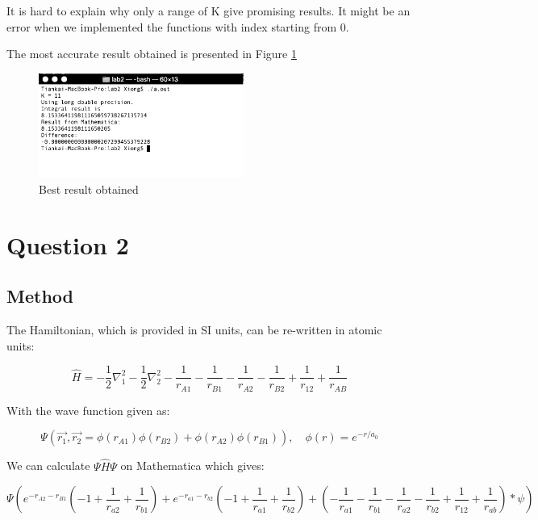 \documentclass{article}
\begin{document}
It is hard to explain why only a range of K give promising
results. It might be an error when we implemented the functions with
index starting from 0.

The most accurate result obtained is presented in Figure \ref{fig:Q2}

\begin{figure}[H]
  \centering
  \includegraphics[width=0.6\textwidth]{Q2_best_result.png}
  \caption{Best result obtained}
  \label{fig:Q2}
\end{figure}

\section{Question 2}
\label{sec-3}
\subsection{Method}
\label{sec-3-1}

The Hamiltonian, which is provided in SI units, can be re-written
in atomic units:

\begin{equation}
  \hat{H} = -\frac{1}{2}\nabla^2_1 - \frac{1}{2}\nabla^2_2 - \frac{1}{r_{A1}}
  - \frac{1}{r_{B1}}  - \frac{1}{r_{A2}}  - \frac{1}{r_{B2}}  + \frac{1}{r_{12}}
   + \frac{1}{r_{AB}}
\end{equation}

With the wave function given as:

\begin{equation}
  \Psi(\vec{r_1}, \vec{r_2} = \phi(r_{A1}) \phi(r_{B2}) + \phi(r_{A2}) \phi(r_{B1})), \quad \phi(r) = e^{-r/a_0}
\end{equation}

We can calculate $\Psi \hat{H} \Psi$ on Mathematica which gives:

\begin{equation}
  \Psi (e^{-r_{A2} - r_{B1}}(-1 + \frac{1}{r_{a2}} + \frac{1}{r_{b1}}) + e^{-r_{a1} - r_{b2}}(-1 + \frac{1}{r_{a1}} + \frac{1}{r_{b2}}) +
  (-\frac{1}{r_{a1}} -\frac{1}{r_{b1}} -\frac{1}{r_{a2}} -\frac{1}{r_{b2}} +\frac{1}{r_{12}}  +\frac{1}{r_{ab}}  )*\psi)
\end{equation}
\end{document}
